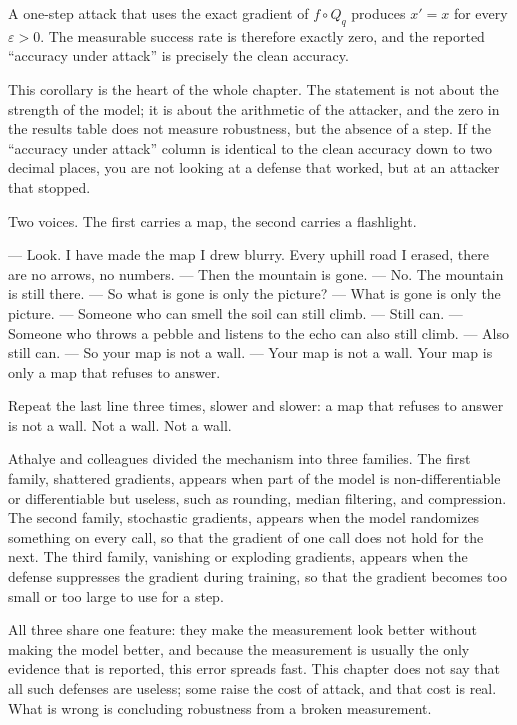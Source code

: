 \begin{akibat}
A one-step attack that uses the exact gradient of $f\circ Q_q$ produces
$x'=x$ for every $\varepsilon>0$. The measurable success rate is therefore
exactly zero, and the reported ``accuracy under attack'' is precisely the clean accuracy.
\end{akibat}

This corollary is the heart of the whole chapter. The statement is not about the strength of the
model; it is about the arithmetic of the attacker, and the zero in the results table does not measure
robustness, but the absence of a step. If the ``accuracy under attack'' column is identical to the
clean accuracy down to two decimal places, you are not looking at a defense that worked, but at an
attacker that stopped.

\begin{bacakeras}
Two voices. The first carries a map, the second carries a flashlight.

--- Look. I have made the map I drew blurry. Every uphill road I erased, there are no arrows, no
numbers.
--- Then the mountain is gone.
--- No. The mountain is still there.
--- So what is gone is only the picture?
--- What is gone is only the picture.
--- Someone who can smell the soil can still climb.
--- Still can.
--- Someone who throws a pebble and listens to the echo can also still climb.
--- Also still can.
--- So your map is not a wall.
--- Your map is not a wall. Your map is only a map that refuses to answer.

Repeat the last line three times, slower and slower: a map that refuses to answer is not a wall. Not
a wall. Not a wall.
\end{bacakeras}

Athalye and colleagues divided the mechanism into three families. The first family, shattered
gradients, appears when part of the model is non-differentiable or differentiable but useless, such
as rounding, median filtering, and compression. The second family, stochastic gradients, appears when
the model randomizes something on every call, so that the gradient of one call does not hold for the
next. The third family, vanishing or exploding gradients, appears when the defense suppresses the
gradient during training, so that the gradient becomes too small or too large to use for a step.

All three share one feature: they make the measurement look better without making the model better,
and because the measurement is usually the only evidence that is reported, this error spreads fast.
This chapter does not say that all such defenses are useless; some raise the cost of attack, and that
cost is real. What is wrong is concluding robustness from a broken measurement.

